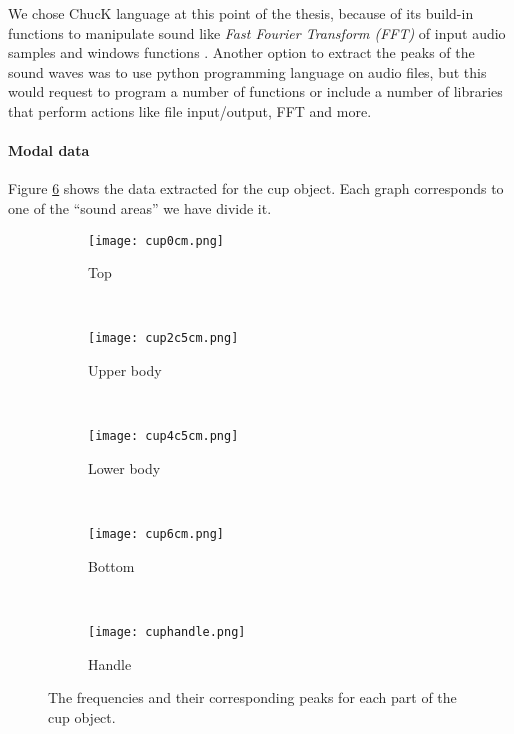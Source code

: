 We chose ChucK language at this point of the thesis, because of its build-in functions to manipulate sound like \textit{Fast Fourier Transform (FFT)} of input audio samples and windows functions \cite{bib:chuck_doc}. Another option to extract the peaks of the sound waves was to use python programming language on audio files, but this would request to program a number of functions or include a number of libraries that perform actions like file input/output, FFT and more. 


\paragraph{Modal data\\}
Figure \ref{fig:cup_data} shows the data extracted for the cup object. Each graph corresponds to one of the ``sound areas'' we have divide it.
 
\begin{figure}[H]
    \centering
    \begin{subfigure}[b]{0.4\textwidth}
        \texttt{[image: cup0cm.png]}
        \caption{Top}
        \label{fig:cup_top}
    \end{subfigure}
    ~ %
    \begin{subfigure}[b]{0.4\textwidth}
        \texttt{[image: cup2c5cm.png]}
        \caption{Upper body}
        \label{fig:cup_upper}
    \end{subfigure}
    ~ %
    \begin{subfigure}[b]{0.4\textwidth}
        \texttt{[image: cup4c5cm.png]}
        \caption{Lower body}
        \label{fig:lower}
    \end{subfigure}
    ~ %
    \begin{subfigure}[b]{0.4\textwidth}
        \texttt{[image: cup6cm.png]}
        \caption{Bottom}
        \label{fig:cup_bottom}
    \end{subfigure}
    ~ %
    \begin{subfigure}[b]{0.4\textwidth}
        \texttt{[image: cuphandle.png]}
        \caption{Handle}
        \label{fig:cup_handle}
    \end{subfigure}
    \caption{The frequencies and their corresponding peaks for each part of the cup object.}\label{fig:cup_data}
\end{figure}
 
